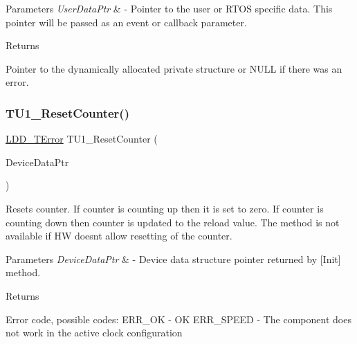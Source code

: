 \begin{DoxyParams}{Parameters}
{\em User\+Data\+Ptr} & -\/ Pointer to the user or R\+T\+OS specific data. This pointer will be passed as an event or callback parameter. \\
\hline
\end{DoxyParams}
\begin{DoxyReturn}{Returns}

\begin{DoxyItemize}
\item Pointer to the dynamically allocated private structure or N\+U\+LL if there was an error. 
\end{DoxyItemize}
\end{DoxyReturn}
\mbox{\label{group___t_u1__module_ga8086edd7db7d8006a1bb8f3882a6706b}} 
\subsubsection{\texorpdfstring{T\+U1\+\_\+\+Reset\+Counter()}{TU1\_ResetCounter()}}
{\footnotesize\ttfamily \hyperlink{group___p_e___types__module_ga24c2b045fd04e79e85f261ce4df35588}{L\+D\+D\+\_\+\+T\+Error} T\+U1\+\_\+\+Reset\+Counter (\begin{DoxyParamCaption}\item[{\hyperlink{group___p_e___types__module_gac5cf1362f1f0e3a2ce71b1bf2276d091}{L\+D\+D\+\_\+\+T\+Device\+Data} $\ast$}]{Device\+Data\+Ptr }\end{DoxyParamCaption})}



Resets counter. If counter is counting up then it is set to zero. If counter is counting down then counter is updated to the reload value. The method is not available if HW doesn\textquotesingle{}t allow resetting of the counter. 


\begin{DoxyParams}{Parameters}
{\em Device\+Data\+Ptr} & -\/ Device data structure pointer returned by \mbox{[}Init\mbox{]} method. \\
\hline
\end{DoxyParams}
\begin{DoxyReturn}{Returns}

\begin{DoxyItemize}
\item Error code, possible codes\+: E\+R\+R\+\_\+\+OK -\/ OK E\+R\+R\+\_\+\+S\+P\+E\+ED -\/ The component does not work in the active clock configuration 
\end{DoxyItemize}
\end{DoxyReturn}
\mbox{\label{group___t_u1__module_ga69e314f91fe2ea96524ce0c389505b6b}} 

